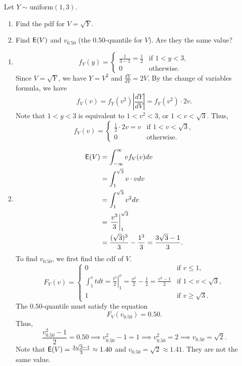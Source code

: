 \documentclass[12pt]{article}
\newcommand{\E}{{\sf E}}
\newenvironment{problem}[2][Problem]{\begin{trivlist}
\item[\hskip \labelsep {\bfseries #1}\hskip \labelsep {\bfseries #2.}]}
{\end{trivlist}}
\begin{document}
\begin{problem}{2}
  Let $Y \sim \text{uniform}(1, 3)$.
  \begin{enumerate}
    \item Find the pdf for $V = \sqrt{Y}$.
    \item Find $\E(V)$ and $v_{0.50}$ (the $0.50$-quantile for $V$). 
    Are they the same value?
  \end{enumerate} 
  \begin{enumerate}
    \item \[
      f_Y (y) =
      \begin{cases}
        \frac{1}{3 - 1} = \frac{1}{2} & \text{if } 1 < y < 3, \\
        0 & \text{otherwise}.
      \end{cases}
    \]
    Since $V = \sqrt{Y}$, we have $Y = V^2$ and $\frac{dY}{dV} = 2V$.
    By the change of variables formula, we have
    \[
      f_V (v) = f_Y (v^2) \left| \frac{dY}{dV} \right|
      = f_Y (v^2) \cdot 2v.
    \]
    Note that $1 < y < 3$ is equivalent to $1 < v^2 < 3$, or $1 < v < \sqrt{3}$.
    Thus,
    \[
      f_V (v) =
      \begin{cases}
        \frac{1}{2} \cdot 2v = v & \text{if } 1 < v < \sqrt{3}, \\
        0 & \text{otherwise}.
      \end{cases}
    \]
    \item \[
      \begin{aligned}
        \E(V) &= \int_{-\infty}^{\infty} v f_V (v) dv \\
        &= \int_1^{\sqrt{3}} v \cdot v dv \\
        &= \int_1^{\sqrt{3}} v^2 dv \\
        &= \left. \frac{v^3}{3} \right|_1^{\sqrt{3}} \\
        &= \frac{(\sqrt{3})^3}{3} - \frac{1^3}{3} = \frac{3\sqrt{3}-1}{3}.
      \end{aligned}
    \]
    To find $v_{0.50}$, we first find the cdf of $V$.
    \[
      F_V (v) =
      \begin{cases}
        0 & \text{if } v \le 1, \\
        \int_1^v t dt = \left. \frac{t^2}{2} \right|_1^v = \frac{v^2}{2} - \frac{1}{2} 
        = \frac{v^2 - 1}{2} & \text{if } 1 < v < \sqrt{3}, \\
        1 & \text{if } v \ge \sqrt{3}.
      \end{cases}
    \]
    The $0.50$-quantile must satisfy the equation
    \[
      F_V (v_{0.50}) = 0.50.
    \]
    Thus,
    \[
      \frac{v_{0.50}^2 - 1}{2} = 0.50 \implies v_{0.50}^2 - 1 = 1 \implies v_{0.50}^2 = 2
      \implies v_{0.50} = \sqrt{2}.
    \]
    Note that $\E(V) = \frac{3\sqrt{3}-1}{3} \approx 1.40$ 
    and $v_{0.50} = \sqrt{2} \approx 1.41$.
    They are not the same value.
  \end{enumerate}

\end{problem}
\end{document}
